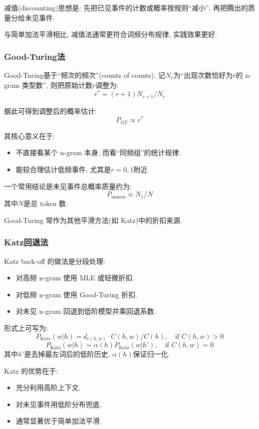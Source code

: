 减值(discounting)思想是:
先把已见事件的计数或概率按规则“减小”, 再把腾出的质量分给未见事件.

与简单加法平滑相比, 减值法通常更符合词频分布规律, 实践效果更好.

\subsubsection{Good-Turing法}


Good-Turing基于“频次的频次”(counts of counts).
记$N_r$为“出现次数恰好为$r$的 n-gram 类型数”, 则把原始计数$r$调整为:
\[
r^* = (r+1) N_{r+1} / N_r
\]

据此可得到调整后的概率估计:
\[
P_{\operatorname{GT}} \propto r^*
\]

其核心意义在于:

\begin{itemize}
\item 不直接看某个 n-gram 本身, 而看“同频组”的统计规律.
\item 能较合理估计低频事件, 尤其是$r=0,1$附近.
\end{itemize}

一个常用结论是未见事件总概率质量约为:
\[
P_{\operatorname{unseen}} \approx N_1 / N
\]
其中$N$是总 token 数.

Good-Turing 常作为其他平滑方法(如 Katz)中的折扣来源.

\subsubsection{Katz回退法}


Katz back-off 的做法是分段处理:

\begin{itemize}
\item 对高频 n-gram 使用 MLE 或轻微折扣.
\item 对低频 n-gram 使用 Good-Turing 折扣.
\item 对未见 n-gram 回退到低阶模型并乘回退系数.
\end{itemize}

形式上可写为:
\[
P_{\operatorname{Katz}}(w|h) = d_{c(h,w)} \cdot C(h,w) / C(h), \quad \text{if } C(h,w) > 0
\]
\[
P_{\operatorname{Katz}}(w|h) = \alpha(h) P_{\operatorname{Katz}}(w|h'), \quad \text{if } C(h,w) = 0
\]
其中$h'$是去掉最左词后的低阶历史, $\alpha(h)$保证归一化.

Katz 的优势在于:

\begin{itemize}
\item 充分利用高阶上下文.
\item 对未见事件用低阶分布兜底.
\item 通常显著优于简单加法平滑.
\end{itemize}

